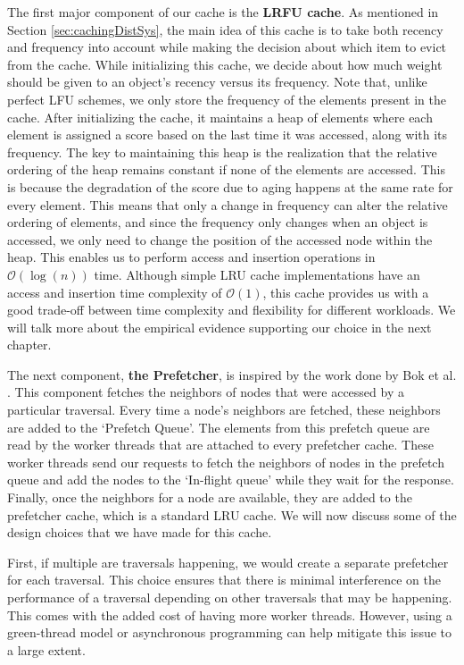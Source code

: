 \medskip
The first major component of our cache is the \textbf{LRFU
cache}\cite{lee2001lrfu}. As mentioned in Section \ref{sec:cachingDistSys}, the
main idea of this cache is to take both recency and frequency into account while
making the decision about which item to evict from the cache. While initializing
this cache, we decide about how much weight should be given to an
object's recency versus its frequency. Note that, unlike perfect LFU schemes, we
only store the frequency of the elements present in the cache. After
initializing the cache, it maintains a heap of elements where each element is
assigned a score based on the last time it was accessed, along with its
frequency. The key to maintaining this heap is the realization that the relative
ordering of the heap remains constant if none of the elements are accessed. This
is because the degradation of the score due to aging happens at the same
rate for every element. This means that only a change in frequency can alter
the relative ordering of elements, and since the frequency only changes when an
object is accessed, we only need to change the position of the accessed node
within the heap. This enables us to perform access and insertion operations in
$\mathcal{O}(\log(n))$ time. Although simple LRU cache implementations have an
access and insertion time complexity of $\mathcal{O}(1)$,  this cache provides 
us with a good trade-off between time complexity and flexibility for 
different workloads. We will talk more about the empirical evidence supporting
our choice in the next chapter.

\medskip
The next component, \textbf{the Prefetcher}, is inspired by the work done
by Bok et al. \cite{bok2020memory}. This component fetches the neighbors of
nodes that were accessed by a particular traversal. Every time a node's
neighbors are fetched, these neighbors are added to the `Prefetch Queue'. The
elements from this prefetch queue are read by the worker threads that are
attached to every prefetcher cache. These worker threads send our requests to
fetch the neighbors of nodes in the prefetch queue and add the nodes to the
`In-flight queue' while they wait for the response. Finally, once the neighbors
for a node are available, they are added to the prefetcher cache, which is a
standard LRU cache. We will now discuss some of the design choices that we have
made for this cache.

\medskip
First, if multiple are traversals happening, we would create a separate
prefetcher for each traversal. This choice ensures that there is minimal
interference on the performance of a traversal depending on other traversals
that may be happening. This comes with the added cost of having more worker
threads. However, using a green-thread model or asynchronous programming can help
mitigate this issue to a large extent. 

